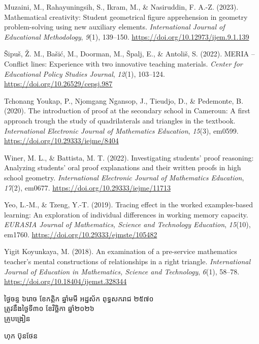 \documentclass[a4paper,12pt]{article}
\begin{document}
{Muzaini, M., Rahayuningsih, S., Ikram, M., \& Nasiruddin, F. A.-Z. (2023). Mathematical creativity: Student geometrical figure apprehension in geometry problem-solving using new auxiliary elements. \textit{International Journal of Educational Methodology}, \textit{9}(1), 139--150. \url{https://doi.org/10.12973/ijem.9.1.139}

Šipuš, Ž. M., Bašić, M., Doorman, M., Špalj, E., \& Antoliš, S. (2022). MERIA -- Conflict lines: Experience with two innovative teaching materials. \textit{Center for Educational Policy Studies Journal}, \textit{12}(1), 103--124. \url{https://doi.org/10.26529/cepsj.987}

Tchonang Youkap, P., Njomgang Ngansop, J., Tieudjo, D., \& Pedemonte, B. (2020). The introduction of proof at the secondary school in Cameroun: A first approach trough the study of quadrilaterals and triangles in the textbook. \textit{International Electronic Journal of Mathematics Education}, \textit{15}(3), em0599. \url{https://doi.org/10.29333/iejme/8404}

Winer, M. L., \& Battista, M. T. (2022). Investigating students' proof reasoning: Analyzing students' oral proof explanations and their written proofs in high school geometry. \textit{International Electronic Journal of Mathematics Education}, \textit{17}(2), em0677. \url{https://doi.org/10.29333/iejme/11713}

Yeo, L.-M., \& Tzeng, Y.-T. (2019). Tracing effect in the worked examples-based learning: An exploration of individual differences in working memory capacity. \textit{EURASIA Journal of Mathematics, Science and Technology Education}, \textit{15}(10), em1760. \url{https://doi.org/10.29333/ejmste/105482}

Yigit Koyunkaya, M. (2018). An examination of a pre-service mathematics teacher's mental constructions of relationships in a right triangle. \textit{International Journal of Education in Mathematics, Science and Technology}, \textit{6}(1), 58--78. \url{https://doi.org/10.18404/ijemst.328344}
\par}

\vspace{14pt}
\Needspace{2.0cm}
\hfill
\begin{minipage}{9.8cm}
  {\centering
    ថ្ងៃចន្ទ ៦រោច ខែកត្តិក ឆ្នាំមមី អដ្ឋស័ក ពុទ្ធសករាជ ២៥៧០\\[2pt]
    ត្រូវនឹងថ្ងៃទី៣០ ខែវិច្ឆិកា ឆ្នាំ២០២៦\\[3pt]
    {\muol គ្រូបង្រៀន}\par}
  \vspace{32pt}
  \hfill{\muol ហុក ប៊ុនថែន}\hspace*{1.4cm}
\end{minipage}
\end{document}
